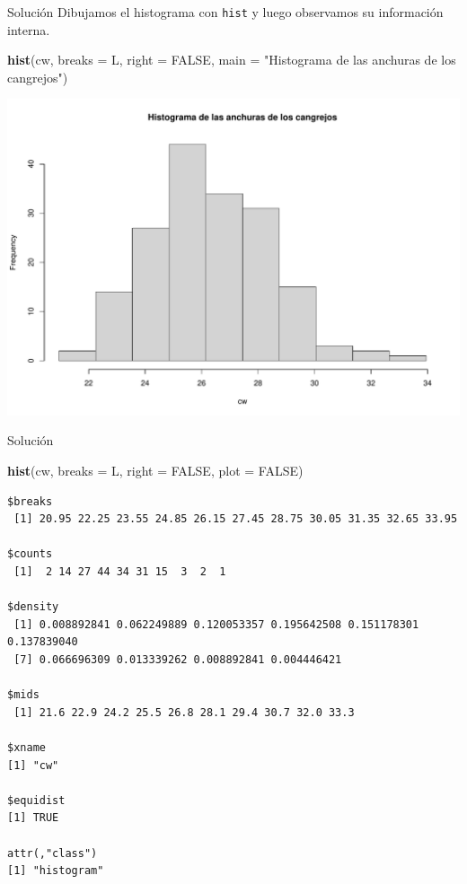 \documentclass[
  ignorenonframetext,
]{beamer}
\newenvironment{Shaded}{\begin{snugshade}}{\end{snugshade}}
\newcommand{\AttributeTok}[1]{\textcolor[rgb]{0.13,0.29,0.53}{#1}}
\newcommand{\ConstantTok}[1]{\textcolor[rgb]{0.56,0.35,0.01}{#1}}
\newcommand{\FunctionTok}[1]{\textcolor[rgb]{0.13,0.29,0.53}{\textbf{#1}}}
\newcommand{\NormalTok}[1]{#1}
\newcommand{\StringTok}[1]{\textcolor[rgb]{0.31,0.60,0.02}{#1}}
\begin{document}
\begin{frame}[fragile]{Solución}
\label{soluciuxf3n-37}
Dibujamos el histograma con \texttt{hist} y luego observamos su
información interna.

\begin{Shaded}
\begin{Highlighting}[]
\FunctionTok{hist}\NormalTok{(cw, }\AttributeTok{breaks =}\NormalTok{ L, }\AttributeTok{right =} \ConstantTok{FALSE}\NormalTok{, }\AttributeTok{main =} \StringTok{"Histograma de las anchuras de los cangrejos"}\NormalTok{)}
\end{Highlighting}
\end{Shaded}

\includegraphics{R_base_files/figure-beamer/unnamed-chunk-244-1.pdf}
\end{frame}

\begin{frame}[fragile]{Solución}
\label{soluciuxf3n-38}
\begin{Shaded}
\begin{Highlighting}[]
\FunctionTok{hist}\NormalTok{(cw, }\AttributeTok{breaks =}\NormalTok{ L, }\AttributeTok{right =} \ConstantTok{FALSE}\NormalTok{, }\AttributeTok{plot =} \ConstantTok{FALSE}\NormalTok{)}
\end{Highlighting}
\end{Shaded}

\begin{verbatim}
$breaks
 [1] 20.95 22.25 23.55 24.85 26.15 27.45 28.75 30.05 31.35 32.65 33.95

$counts
 [1]  2 14 27 44 34 31 15  3  2  1

$density
 [1] 0.008892841 0.062249889 0.120053357 0.195642508 0.151178301 0.137839040
 [7] 0.066696309 0.013339262 0.008892841 0.004446421

$mids
 [1] 21.6 22.9 24.2 25.5 26.8 28.1 29.4 30.7 32.0 33.3

$xname
[1] "cw"

$equidist
[1] TRUE

attr(,"class")
[1] "histogram"
\end{verbatim}
\end{frame}
\end{document}
